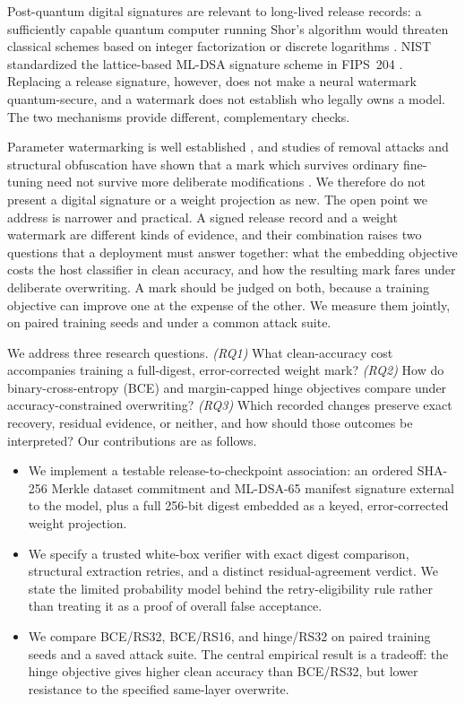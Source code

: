 \documentclass[conference]{IEEEtran}
\begin{document}
Post-quantum digital signatures are relevant to long-lived release records:
a sufficiently capable quantum computer running Shor's algorithm would threaten
classical schemes based on integer factorization or discrete logarithms
\cite{shor1994algorithms}. NIST standardized the lattice-based ML-DSA signature
scheme in FIPS~204 \cite{nist204}. Replacing a release signature, however, does
not make a neural watermark quantum-secure, and a watermark does not establish
who legally owns a model. The two mechanisms provide different, complementary
checks.

Parameter watermarking is well established \cite{uchida2017embedding}, and
studies of removal attacks and structural obfuscation have shown that a mark
which survives ordinary fine-tuning need not survive more deliberate
modifications \cite{lukas2022sok,yan2023rethinking}. We therefore do not
present a digital signature or a weight projection as new. The open point we
address is narrower and practical. A signed release record and a weight
watermark are different kinds of evidence, and their combination raises two
questions that a deployment must answer together: what the embedding objective
costs the host classifier in clean accuracy, and how the resulting mark fares
under deliberate overwriting. A mark should be judged on both, because a
training objective can improve one at the expense of the other. We measure
them jointly, on paired training seeds and under a common attack suite.

We address three research questions. \emph{(RQ1)} What clean-accuracy cost
accompanies training a full-digest, error-corrected weight mark? \emph{(RQ2)}
How do binary-cross-entropy (BCE) and margin-capped hinge objectives compare
under accuracy-constrained overwriting? \emph{(RQ3)} Which recorded changes
preserve exact recovery, residual evidence, or neither, and how should those
outcomes be interpreted? Our contributions are as follows.
\begin{itemize}
\item We implement a testable release-to-checkpoint association: an ordered
SHA-256 Merkle dataset commitment and ML-DSA-65 manifest signature external to
the model, plus a full 256-bit digest embedded as a keyed, error-corrected
weight projection.
\item We specify a trusted white-box verifier with exact digest comparison,
structural extraction retries, and a distinct residual-agreement verdict. We
state the limited probability model behind the retry-eligibility rule rather
than treating it as a proof of overall false acceptance.
\item We compare BCE/RS32, BCE/RS16, and hinge/RS32 on paired training seeds
and a saved attack suite. The central empirical result is a tradeoff: the
hinge objective gives higher clean accuracy than BCE/RS32, but lower resistance
to the specified same-layer overwrite.
\end{itemize}
\end{document}
